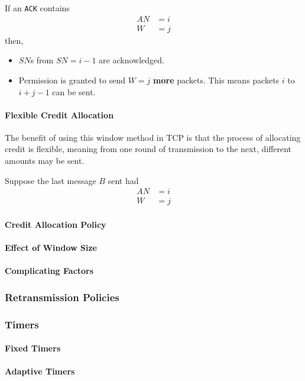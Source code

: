 If an \texttt{ACK} contains
\begin{align*}
  AN &= i \\
  W &= j
\end{align*}
then,
\begin{itemize}[noitemsep]
\item $SN$s from $SN = i - 1$ are acknowledged.
\item Permission is granted to send $W = j$ \textbf{more} packets.
  This means packets $i$ to $i + j - 1$ can be sent.
\end{itemize}

\paragraph{Flexible Credit Allocation}\label{par:TCP_Flexible_Credit_Allocation}
The benefit of using this window method in TCP is that the process of allocating credit is flexible, meaning from one round of transmission to the next, different amounts may be sent.

Suppose the last message $B$ sent had
\begin{align*}
  AN &= i \\
  W &= j
\end{align*}

\paragraph{Credit Allocation Policy}\label{par:TCP_Credit_Allocation_Policy}
\paragraph{Effect of Window Size}\label{par:TCP_Window_Size_Effect}
\paragraph{Complicating Factors}\label{par:TCP_Complicating_Factors}
\subsubsection{Retransmission Policies}\label{subsubsec:Retransmission_Policies}
\subsubsection{Timers}\label{subsubsec:Packet_Timers}
\paragraph{Fixed Timers}\label{par:Fixed_Packet_Timers}
\paragraph{Adaptive Timers}\label{par:Adaptive_Packet_Timers}
